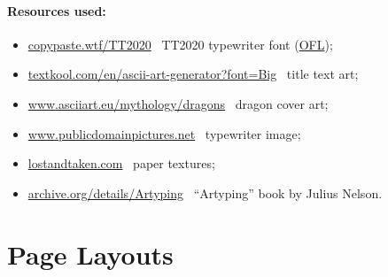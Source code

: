 \documentclass[english,12pt,openany,letterpaper]{book}
\begin{document}
\skipline

\paragraph{Resources used:}
\begin{itemize}
	\item \href{https://copypaste.wtf/TT2020/}{copypaste.wtf/TT2020} \dash\ TT2020 typewriter font (\href{https://openfontlicense.org/}{OFL});
	\item \href{https://textkool.com/en/ascii-art-generator?font=Big&text=Retrotype}{textkool.com/en/ascii-art-generator?font=Big} \dash\ title text art;
	\item \href{https://www.asciiart.eu/mythology/dragons}{www.asciiart.eu/mythology/dragons} \dash\ dragon cover art;
	\item \href{https://www.publicdomainpictures.net/en/view-image.php?image=166303}{www.publicdomainpictures.net} \dash\ typewriter image;
	\item \href{https://lostandtaken.com/}{lostandtaken.com} \dash\ paper textures;
	\item \href{https://archive.org/details/Artyping}{archive.org/details/Artyping} \dash\  ``Artyping'' book by Julius Nelson.
\end{itemize}

\break


\section{Page Layouts}
\end{document}
